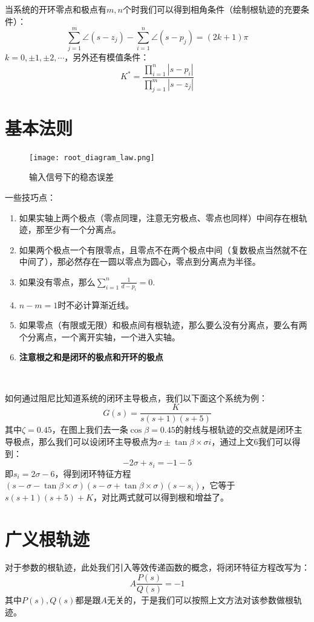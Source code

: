 \documentclass[lang=cn,10pt]{elegantbook}
\begin{document}
当系统的开环零点和极点有$m,n$个时我们可以得到相角条件（绘制根轨迹的充要条件）：
\[\sum\limits_{j=1}^m \angle(s-z_j)-\sum\limits_{i=1}^n\angle(s-p_j)=(2k+1)\pi\]
$k=0,\pm1,\pm2,\cdots$，另外还有模值条件：
\[K^*=\frac{\prod\limits_{i=1}^n|s-p_i|}{\prod\limits_{j=1}^m|s-z_j|}\]

\section{基本法则}

\begin{figure}[htbp]
  \centering
  \texttt{[image: root\_diagram\_law.png]}
  \caption{输入信号下的稳态误差} \label{fig:root_diagram_law}
\end{figure}

一些技巧点：
\begin{enumerate}
    \item 如果实轴上两个极点（零点同理，注意无穷极点、零点也同样）中间存在根轨迹，那至少有一个分离点。
    \item 如果两个极点一个有限零点，且零点不在两个极点中间（复数极点当然就不在中间了），那必然存在一圆以零点为圆心，零点到分离点为半径。
    \item 如果没有零点，那么$\sum_{i=1}^{n} \frac{1}{d-p_i}=0$.
    \item $n-m=1$时不必计算渐近线。
    \item 如果零点（有限或无限）和极点间有根轨迹，那么要么没有分离点，要么有两个分离点，一个离开实轴，一个进入实轴。
    \item \textbf{注意根之和是闭环的极点和开环的极点}
\end{enumerate}

~\par
\textcolor[rgb]{0.75, 0.5, 0.25}{如何通过阻尼比知道系统的闭环主导极点}，我们以下面这个系统为例：
\[G(s)=\frac{K}{s(s+1)(s+5)}\]
其中$\zeta=0.45$，在图上我们去一条$\cos{\beta}=0.45$的射线与根轨迹的交点就是闭环主导极点，那么我们可以设闭环主导极点为$\sigma \pm \tan{\beta} \times \sigma i$，通过上文6我们可以得到：
\[-2\sigma +s_i = -1-5\]
即$s_i = 2\sigma-6$，得到闭环特征方程$(s-\sigma-\tan{\beta} \times \sigma)(s-\sigma+\tan{\beta} \times \sigma)(s-s_i)$，它等于$s(s+1)(s+5)+K$，对比两式就可以得到根和增益了。

\section{广义根轨迹}
对于参数的根轨迹，此处我们引入等效传递函数的概念，将闭环特征方程改写为：
\[A\frac{P(s)}{Q(s)}=-1\]
其中$P(s),Q(s)$都是跟$A$无关的，于是我们可以按照上文方法对该参数做根轨迹。
\end{document}
